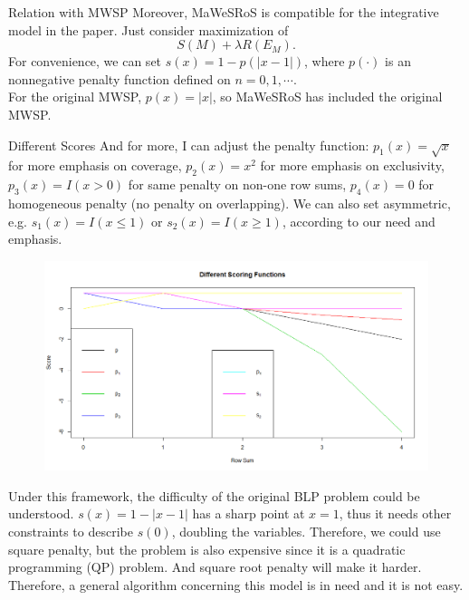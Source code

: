 \documentclass[xcolor=dvipsnames]{beamer}
\begin{document}
\begin{frame}{Relation with MWSP}
Moreover, MaWeSRoS is compatible for the integrative model in the paper. Just consider maximization of
\[
S(M)+\lambda R(E_M).
\]
For convenience, we can set $s(x)=1-p(|x-1|)$, where $p(\cdot)$ is an nonnegative penalty function defined on $n=0,1,\cdots$.\\
For the original MWSP, $p(x)=|x|$, so MaWeSRoS has included the original MWSP.\\
\end{frame}
\begin{frame}{Different Scores}
And for more, I can adjust the penalty function: $p_1(x)=\sqrt{x}$ for more emphasis on coverage, $p_2(x)=x^2$ for more emphasis on exclusivity, $p_3(x)=I(x>0)$ for same penalty on non-one row sums, $p_4(x)=0$ for homogeneous penalty (no penalty on overlapping). We can also set asymmetric, e.g. $s_1(x)=I(x\leqslant1)$ or $s_2(x)=I(x\geqslant1)$, according to our need and emphasis.\\
\begin{figure}
\centering
\includegraphics[width=0.8\linewidth]{diffscores.png}
\end{figure}
\end{frame}
\begin{frame}
Under this framework, the difficulty of the original BLP problem could be understood. $s(x)=1-|x-1|$ has a sharp point at $x=1$, thus it needs other constraints to describe $s(0)$, doubling the variables. Therefore, we could use square penalty, but the problem is also expensive since it is a quadratic programming (QP) problem. And square root penalty will make it harder.\\
Therefore, a general algorithm concerning this model is in need and it is not easy.\\
\end{frame}

\end{document}
